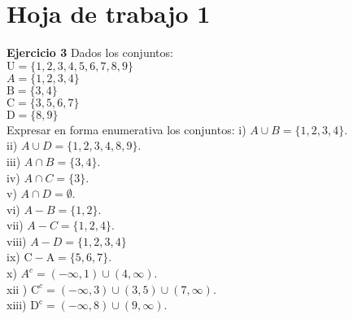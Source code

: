 \documentclass[a4paper,12pt]{article}
\begin{document}
\section{Hoja de trabajo 1}

\textbf{Ejercicio 3}
Dados los conjuntos:\\
$\mathrm{U}=\{1,2,3,4,5,6,7,8,9\}$\\
$A=\{1,2,3,4\}$\\
$\mathrm{B}=\{3,4\}$\\
$\mathrm{C}=\{3,5,6,7\}$\\
$\mathrm{D}=\{8,9\}$\\
Expresar en forma enumerativa los conjuntos:\newline\newline
i) $A \cup B = \{1,2,3,4\}$.\\
ii) $A \cup D=\{1,2,3,4,8,9\}$.\\
iii) $A \cap B = \{3,4\}$.\\
iv) $A \cap C = \{3\}$.\\
v) $A \cap D = \emptyset$.\\
vi) $A-B = \{1,2\}$.\\
vii) $A-C=\{1,2,4\}$.\\
viii) $A-D=\{1,2,3,4\}$\\
ix) $\mathrm{C}-\mathrm{A}= \{5,6,7\}$.\\
x) $A^{c}=(-\infty,1)\cup (4,\infty)$.\\
xii ) $\mathrm{C}^{c}=(-\infty,3)\cup (3,5)\cup (7,\infty) $.\\
xiii) $\mathrm{D}^{\mathrm{c}}= (-\infty,8)\cup (9,\infty)$.\newline\newline 
\end{document}
